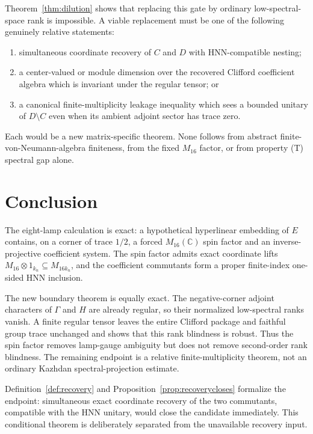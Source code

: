 \documentclass[11pt]{article}
\theoremstyle{definition}
\theoremstyle{remark}
\newcommand{\C}{\mathbb C}
\begin{document}
Theorem~\ref{thm:dilution} shows that replacing this gate by ordinary
low-spectral-space rank is impossible.  A viable replacement must be one of
the following genuinely relative statements:
\begin{enumerate}
\item simultaneous coordinate recovery of $C$ and $D$ with HNN-compatible
      nesting;
\item a center-valued or module dimension over the recovered Clifford
      coefficient algebra which is invariant under the regular tensor; or
\item a canonical finite-multiplicity leakage inequality which sees a
      bounded unitary of $D\setminus C$ even when its ambient adjoint sector
      has trace zero.
\end{enumerate}
Each would be a new matrix-specific theorem.  None follows from abstract
finite-von-Neumann-algebra finiteness, from the fixed $M_{16}$ factor, or
from property (T) spectral gap alone.

\section{Conclusion}

The eight-lamp calculation is exact: a hypothetical hyperlinear embedding
of $E$ contains, on a corner of trace $1/2$, a forced
$M_{16}(\C)$ spin factor and an inverse-projective coefficient system.
The spin factor admits exact coordinate lifts
$M_{16}\otimes1_{k_n}\subseteq M_{16k_n}$, and the coefficient commutants
form a proper finite-index one-sided HNN inclusion.

The new boundary theorem is equally exact.  The negative-corner adjoint
characters of $\Gamma$ and $H$ are already regular, so their normalized
low-spectral ranks vanish.  A finite regular tensor leaves the entire
Clifford package and faithful group trace unchanged and shows that this rank
blindness is robust.  Thus the spin factor removes
lamp-gauge ambiguity but does not remove second-order rank blindness.  The
remaining endpoint is a relative finite-multiplicity theorem, not an
ordinary Kazhdan spectral-projection estimate.

Definition~\ref{def:recovery} and
Proposition~\ref{prop:recoverycloses} formalize the endpoint: simultaneous
exact coordinate recovery of the two commutants, compatible with the HNN
unitary, would close the candidate immediately.  This conditional theorem
is deliberately separated from the unavailable recovery input.
\end{document}
